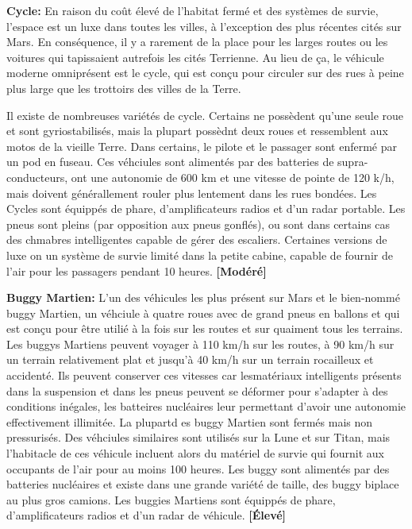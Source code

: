 \textbf{Cycle:} En raison du coût élevé de l'habitat fermé et des systèmes de survie, l'espace est un luxe dans toutes les villes, à l'exception des plus récentes cités sur Mars. En conséquence, il y a rarement de la place pour les larges routes ou les voitures qui tapissaient autrefois les cités Terrienne. Au lieu de ça, le véhicule moderne omniprésent est le cycle, qui est conçu pour circuler sur des rues à peine plus large que les trottoirs des villes de la Terre. 

Il existe de nombreuses variétés de cycle. Certains ne possèdent qu'une seule roue et sont gyriostabilisés, mais la plupart possèdnt deux roues et ressemblent aux motos de la vieille Terre. Dans certains, le pilote et le passager sont enfermé par un pod en fuseau. Ces véhciules sont alimentés par des batteries de supra-conducteurs, ont une autonomie de 600 km et une vitesse de pointe de 120 k/h, mais doivent générallement rouler plus lentement dans les rues bondées. Les Cycles sont équippés de phare, d'amplificateurs radios et d'un radar portable. Les pneus sont pleins (par opposition aux pneus gonflés), ou sont dans certains cas des chmabres intelligentes capable de gérer des escaliers. Certaines versions de luxe on un système de survie limité dans la petite cabine, capable de fournir de l'air pour les passagers pendant 10 heures. \textbf{[Modéré]} 

\textbf{Buggy Martien:} L'un des véhicules les plus présent sur Mars et le bien-nommé buggy Martien, un véhciule à quatre roues avec de grand pneus en ballons et qui est conçu pour être utilié à la fois sur les routes et sur quaiment tous les terrains. Les buggys Martiens peuvent voyager à 110 km/h sur les routes, à 90 km/h sur un terrain relativement plat et jusqu'à 40 km/h sur un terrain rocailleux et accidenté. Ils peuvent conserver ces vitesses car lesmatériaux intelligents présents dans la suspension et dans les pneus peuvent se déformer pour s'adapter à des conditions inégales, les batteires nucléaires leur permettant d'avoir une autonomie effectivement illimitée. La plupartd es buggy Martien sont fermés mais non pressurisés. Des véhciules similaires sont utilisés sur la Lune et sur Titan, mais l'habitacle de ces véhicule incluent alors du matériel de survie qui fournit aux occupants de l'air pour au moins 100 heures. Les buggy sont alimentés par des batteries nucléaires et existe dans une grande variété de taille, des buggy biplace au plus gros camions. Les buggies Martiens sont équippés de phare, d'amplificateurs radios et d'un radar de véhicule. \textbf{[Élevé]} 

